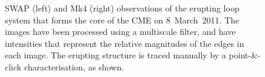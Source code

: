 \documentclass[namedreferences]{solarphysics}
\begin{document}
\begin{article}
\begin{figure}[p]
\caption{SWAP (left) and Mk4 (right) observations of the erupting loop system that forms the core of the CME on 8~March~2011. The images have been processed using a multiscale filter, and have intensities that represent the relative magnitudes of the edges in each image. The erupting structure is traced manually by a point-\&-click characterisation, as shown.}
\label{combined_modgrad_points}
\end{figure}


\end{article}
\end{document}
